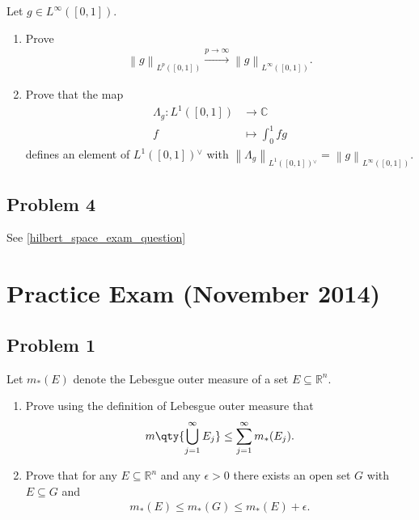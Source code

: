 Let \(g\in L^\infty([0, 1])\).

\begin{enumerate}
\def\labelenumi{\alph{enumi}.}
\item
  Prove
  \begin{align*}
  {\left\lVert {g} \right\rVert}_{L^p([0, 1])}  \overset{p\to\infty}\to {\left\lVert {g} \right\rVert}_{L^\infty([0, 1])}
  .\end{align*}
\item
  Prove that the map
  \begin{align*}
  \Lambda_g: L^1([0, 1]) &\to {\mathbb{C}}\\
  f &\mapsto \int_0^1 fg
  \end{align*}
  defines an element of \(L^1([0, 1]) {}^{ \vee }\) with
  \({\left\lVert {\Lambda_g} \right\rVert}_{L^1([0, 1]) {}^{ \vee }}= {\left\lVert {g} \right\rVert}_{L^\infty([0, 1])}\).
\end{enumerate}

\hypertarget{problem-4-1}{%
\subsection{Problem 4}\label{problem-4-1}}

See \cref{hilbert_space_exam_question}

\hypertarget{practice-exam-november-2014}{%
\section{Practice Exam (November
2014)}\label{practice-exam-november-2014}}

\hypertarget{problem-1-2}{%
\subsection{Problem 1}\label{problem-1-2}}

Let \(m_*(E)\) denote the Lebesgue outer measure of a set
\(E \subseteq {\mathbb{R}}^n\).

\begin{enumerate}
\def\labelenumi{\alph{enumi}.}
\item
  Prove using the definition of Lebesgue outer measure that
  \begin{align*}
  m \qty{ \displaystyle\bigcup_{j=1}^{\infty } E_j  } \leq \sum_{j=1}^{\infty } m_*(E_j) 
  .\end{align*}
\item
  Prove that for any \(E \subseteq {\mathbb{R}}^n\) and any
  \(\epsilon> 0\) there exists an open set \(G\) with \(E \subseteq G\)
  and
  \begin{align*}
  m_*(E) \leq m_*(G) \leq m_*(E) + \epsilon
  .\end{align*}
\end{enumerate}

